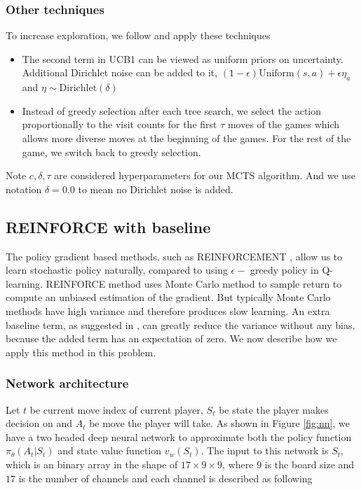 \documentclass{article}
\begin{document}
\subsubsection{Other techniques}
\label{sec:othertechniques}
To increase exploration, we follow \cite{silver2017masteringalphagozero} and apply these techniques
\begin{itemize}
  \item
    The second term in UCB1 can be viewed as uniform priors on uncertainty. Additional Dirichlet noise can be added to it, $ (1-\epsilon) \text{Uniform}(s,a) + \epsilon \eta_a$ and $\eta \sim \text{Dirichlet}(\delta)$
  \item 
  Instead of greedy selection after each tree search, we select the action proportionally to the visit counts for the first $\tau$ moves of the games which allows more diverse moves at the beginning of the games. For the rest of the game, we switch back to greedy selection.
\end{itemize}
Note $c, \delta, \tau$ are considered hyperparameters for our MCTS algorithm. And we use notation $\delta=0.0$ to mean no Dirichlet noise is added.


\subsection{REINFORCE with baseline}
The policy gradient based methods, such as REINFORCEMENT \cite{williams1987reinforcement}, allow us to learn stochastic policy naturally, compared to using $\epsilon-$ greedy policy in Q-learning. REINFORCE method uses Monte Carlo method to sample return to compute an unbiased estimation of the gradient. But typically Monte Carlo methods have high variance and therefore produces slow learning. An extra baseline term, as suggested in \cite{sutton2018reinforcement}, can greatly reduce the variance without any bias, because the added term has an expectation of zero. We now describe how we apply this method in this problem.


\subsubsection{Network architecture}
\label{sec:nn}
Let $t$ be current move index of current player, $S_t$ be state the player makes decision on and $A_t$ be move the player will take. As shown in Figure \ref{fig:nn}, we have a two headed deep neural network to approximate both the policy function $\pi_{\theta}(A_t|S_t)$ and state value function $v_w(S_t)$.  The input to this network is $S_t$, which is an binary array in the shape of $17 \times 9 \times 9$, where $9$ is the board size and $17$ is the number of channels and each channel is described as following 
\end{document}
